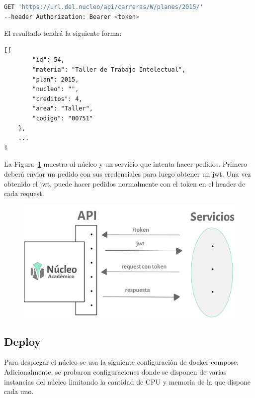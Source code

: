 \begin{lstlisting}[language=bash]
GET 'https://url.del.nucleo/api/carreras/W/planes/2015/'
--header Authorization: Bearer <token>
\end{lstlisting}

El resultado tendrá la siguiente forma:

\begin{verbatim}
[{
        "id": 54,
        "materia": "Taller de Trabajo Intelectual",
        "plan": 2015,
        "nucleo": "",
        "creditos": 4,
        "area": "Taller",
        "codigo": "00751"
    },
    ...
]
\end{verbatim}

La Figura~\ref{fig:nucleo-jwt} muestra al núcleo y un servicio que intenta hacer pedidos. Primero deberá enviar un pedido con sus credenciales para luego obtener un jwt. 
Una vez obtenido el jwt, puede hacer pedidos normalmente con el token en el header de cada request.

\begin{figure}[H]
  \centering
    \includegraphics[scale=0.8]{images/nucleo/jwt.png}
  \label{fig:nucleo-jwt}
\end{figure}


\subsection{Deploy}

Para desplegar el núcleo se usa la siguiente configuración de docker-compose. Adicionalmente, se probaron configuraciones donde se disponen de varias instancias del núcleo limitando la cantidad de CPU y memoria de la que dispone cada uno. 

